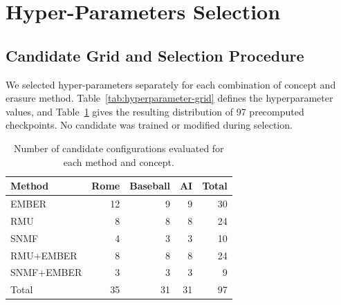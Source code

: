\section{Hyper-Parameters Selection}
\label{app:checkpoint-selection}

\begin{table}[h]
  \centering
  \scriptsize
  \caption{Complete candidate grid. Cartesian products are taken within each
  row. EMBER's $\delta$ is edit strength; RMU's $\alpha$ weights retention.}
  \label{tab:hyperparameter-grid}
\end{table}

\subsection{Candidate Grid and Selection Procedure}

We selected hyper-parameters separately for each combination of concept and
erasure method. Table~\ref{tab:hyperparameter-grid} defines the hyperparameter
values, and Table~\ref{tab:selection-grid-size} gives the resulting distribution
of 97 precomputed checkpoints. No candidate was trained or modified during
selection.

\begin{table}[h]
  \centering
  \small
  \begin{tabular}{lrrrr}
    \toprule
    Method & Rome & Baseball & AI & Total \\
    \midrule
    EMBER & 12 & 9 & 9 & 30 \\
    RMU & 8 & 8 & 8 & 24 \\
    SNMF & 4 & 3 & 3 & 10 \\
    RMU+EMBER & 8 & 8 & 8 & 24 \\
    SNMF+EMBER & 3 & 3 & 3 & 9 \\
    \midrule
    Total & 35 & 31 & 31 & 97 \\
    \bottomrule
  \end{tabular}
  \caption{Number of candidate configurations evaluated for each method and
  concept.}
  \label{tab:selection-grid-size}
\end{table}

